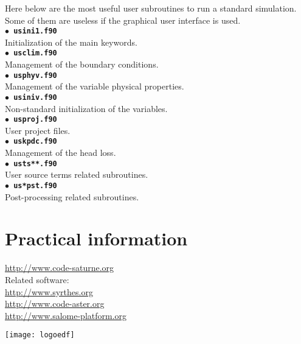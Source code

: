 \documentclass[a4paper,11pt]{article}
\newcommand{\refword}[1]{\texttt{$\bullet$ \bf{#1}}}
\begin{document}
\begin{multicols*}{3}
Here below are the most useful user subroutines to run a standard
simulation. Some of them are useless if the graphical user interface
is used.\\

\refword{usini1.f90}\\
Initialization of the main keywords.\\

\refword{usclim.f90}\\
Management of the boundary conditions.\\

\refword{usphyv.f90}\\
Management of the variable physical properties.\\

\refword{usiniv.f90}\\
Non-standard initialization of the variables.\\

\refword{usproj.f90}\\
User project files.\\

\refword{uskpdc.f90}\\
Management of the head loss.\\

\refword{usts**.f90}\\
User source terms related subroutines.\\

\refword{us*pst.f90}\\
Post-processing related subroutines.\\




\section*{Practical information}

\url{http://www.code-saturne.org}\\

Related software:\\
\url{http://www.syrthes.org}\\
\url{http://www.code-aster.org}\\
\url{http://www.salome-platform.org}

\begin{center}
  \texttt{[image: logoedf]}
\end{center}

\end{multicols*}
\end{document}
